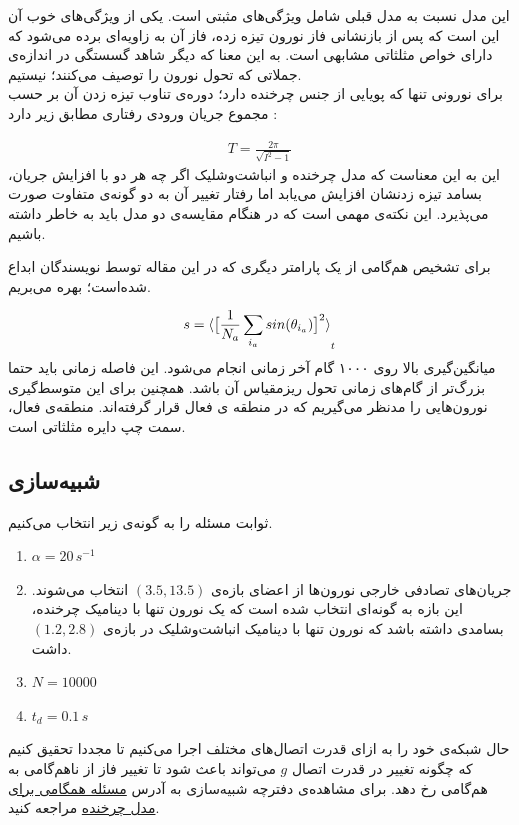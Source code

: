 \documentclass[12pt,onecolumn,a4paper]{article}
\begin{document}
این مدل نسبت به مدل قبلی شامل ویژگی‌های مثبتی است. یکی از ویژگی‌های خوب آن این است که پس از بازنشانی فاز نورون تیزه زده، فاز آن به زاویه‌ای برده می‌شود که دارای خواص مثلثاتی مشابهی است. به این معنا که دیگر شاهد گسستگی در اندازه‌ی جملاتی که تحول نورون را توصیف می‌کنند؛ نیستیم.\\
برای نورونی تنها که پویایی از جنس چرخنده دارد؛ دوره‌ی تناوب تیزه زدن آن بر حسب مجموع جریان ورودی‌ رفتاری مطابق زیر دارد \cite{safaeesirat2020critical}:

\begin{align}
T = \frac{2\pi}{\sqrt{I^2 - 1}}
\end{align}
این به این معناست که مدل چرخنده و انباشت‌وشلیک اگر چه هر دو با افزایش جریان، بسامد تیزه زدنشان افزایش می‌یابد اما رفتار تغییر آن به دو گونه‌ی متفاوت صورت می‌پذیرد. این نکته‌ی مهمی است که در هنگام مقایسه‌ی دو مدل باید به خاطر داشته باشیم.

برای تشخیص هم‌گامی از یک پارامتر دیگری که در این مقاله \cite{safaeesirat2020critical}  توسط نویسندگان ابداع شده‌است؛ بهره می‌بریم.

\begin{equation}
s =  \braket{ \big[ \frac{1}{N_a}\sum_{i_a} sin(\theta_{i_a}) \big]^{2}}_t
\label{eq:saman_amin_param}
\end{equation}
میانگین‌گیری بالا روی ۱۰۰۰ گام آخر زمانی انجام می‌شود. این فاصله زمانی باید حتما بزرگ‌تر از گام‌های زمانی تحول ریزمقیاس آن باشد. همچنین برای این متوسط‌گیری نورون‌هایی را مدنظر می‌گیریم که در منطقه ی فعال قرار گرفته‌اند. منطقه‌ی فعال، سمت چپ دایره مثلثاتی است.
\subsection{شبیه‌سازی}
ثوابت مسئله را به گونه‌ی زیر انتخاب می‌کنیم.
\begin{tcolorbox}[colback=green!5!white,colframe=green!75!black]
\begin{enumerate}[*]
\item
$\alpha = 20\, s^{-1}$
\item
جریان‌های تصادفی خارجی نورون‌ها از اعضای بازه‌ی $(3.5,13.5)$ انتخاب می‌شوند. این بازه به گونه‌ای انتخاب شده است که یک نورون تنها با دینامیک چرخنده، بسامدی داشته باشد که نورون تنها‌ با دینامیک انباشت‌وشلیک در بازه‌ی $(1.2,2.8)$ داشت.
\item
$N = 10000$
\item
$t_d = 0.1\, s$ 
\end{enumerate}
\end{tcolorbox}
حال شبکه‌ی خود را به ازای قدرت اتصال‌های مختلف اجرا می‌کنیم تا مجددا تحقیق کنیم که چگونه تغییر در قدرت اتصال $g$ می‌تواند باعث شود تا تغییر فاز از ناهم‌گامی به هم‌گامی رخ دهد. برای مشاهده‌ی دفترچه شبیه‌سازی به آدرس 
\href{run://..//scripts//rotational_model}{مسئله همگامی برای مدل چرخنده}
مراجعه کنید.
\end{document}
